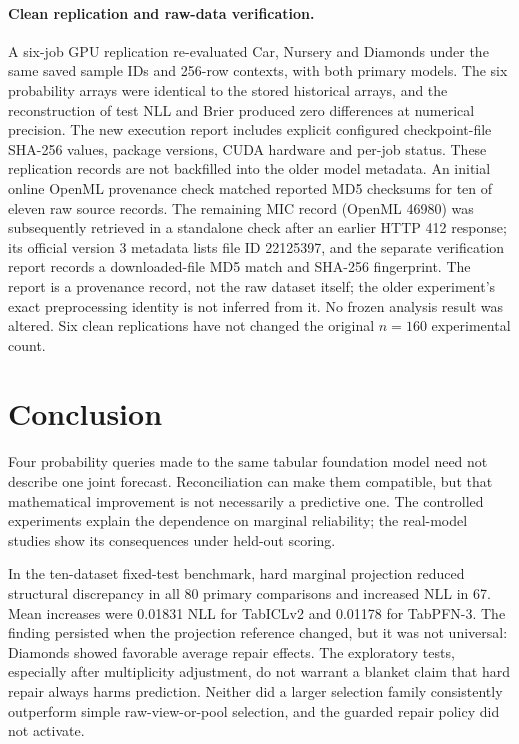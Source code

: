 \documentclass[a4paper,fleqn]{cas-sc}
\begin{document}
\paragraph{Clean replication and raw-data verification.}
A six-job GPU replication re-evaluated Car, Nursery and Diamonds under the same saved sample IDs and 256-row contexts, with both primary models. The six probability arrays were identical to the stored historical arrays, and the reconstruction of test NLL and Brier produced zero differences at numerical precision. The new execution report includes explicit configured checkpoint-file SHA-256 values, package versions, CUDA hardware and per-job status. These replication records are not backfilled into the older model metadata. An initial online OpenML provenance check matched reported MD5 checksums for ten of eleven raw source records. The remaining MIC record (OpenML 46980) was subsequently retrieved in a standalone check after an earlier HTTP 412 response; its official version 3 metadata lists file ID 22125397, and the separate verification report records a downloaded-file MD5 match and SHA-256 fingerprint. The report is a provenance record, not the raw dataset itself; the older experiment's exact preprocessing identity is not inferred from it. No frozen analysis result was altered. Six clean replications have not changed the original $n=160$ experimental count.

\FloatBarrier
\section{Conclusion}
Four probability queries made to the same tabular foundation model need not describe one joint forecast. Reconciliation can make them compatible, but that mathematical improvement is not necessarily a predictive one. The controlled experiments explain the dependence on marginal reliability; the real-model studies show its consequences under held-out scoring.

In the ten-dataset fixed-test benchmark, hard marginal projection reduced structural discrepancy in all 80 primary comparisons and increased NLL in 67. Mean increases were 0.01831 NLL for TabICLv2 and 0.01178 for TabPFN-3. The finding persisted when the projection reference changed, but it was not universal: Diamonds showed favorable average repair effects. The exploratory tests, especially after multiplicity adjustment, do not warrant a blanket claim that hard repair always harms prediction. Neither did a larger selection family consistently outperform simple raw-view-or-pool selection, and the guarded repair policy did not activate.
\end{document}
